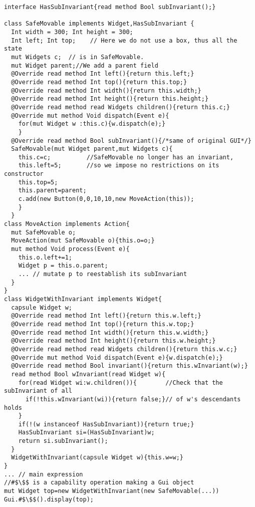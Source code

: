 \begin{lstlisting}
interface HasSubInvariant{read method Bool subInvariant();}

class SafeMovable implements Widget,HasSubInvariant {
  Int width = 300; Int height = 300;
  Int left; Int top;    // Here we do not use a box, thus all the state
  mut Widgets c;  // is in SafeMovable.
  mut Widget parent;//We add a parent field
  @Override read method Int left(){return this.left;}
  @Override read method Int top(){return this.top;}
  @Override read method Int width(){return this.width;}
  @Override read method Int height(){return this.height;}
  @Override read method read Widgets children(){return this.c;}
  @Override mut method Void dispatch(Event e){
    for(mut Widget w :this.c){w.dispatch(e);}
    }
  @Override read method Bool subInvariant(){/*same of original GUI*/}
  SafeMovable(mut Widget parent,mut Widgets c){
    this.c=c;          //SafeMovable no longer has an invariant,
    this.left=5;       //so we impose no restrictions on its constructor
    this.top=5;
    this.parent=parent;
    c.add(new Button(0,0,10,10,new MoveAction(this));
    }
  }
class MoveAction implements Action{
  mut SafeMovable o;
  MoveAction(mut SafeMovable o){this.o=o;}
  mut method Void process(Event e){
    this.o.left+=1;
    Widget p = this.o.parent;
    ... // mutate p to reestablish its subInvariant
  }
}
class WidgetWithInvariant implements Widget{
  capsule Widget w;
  @Override read method Int left(){return this.w.left;}
  @Override read method Int top(){return this.w.top;}
  @Override read method Int width(){return this.w.width;}
  @Override read method Int height(){return this.w.height;}
  @Override read method read Widgets children(){return this.w.c;}
  @Override mut method Void dispatch(Event e){w.dispatch(e);}
  @Override read method Bool invariant(){return this.wInvariant(w);}
  read method Bool wInvariant(read Widget w){
    for(read Widget wi:w.children()){        //Check that the subInvariant of all
      if(!this.wInvariant(wi)){return false;}// of w's descendants holds
    }
    if(!(w instanceof HasSubInvariant)){return true;}
    HasSubInvariant si=(HasSubInvariant)w;
    return si.subInvariant();
  }
  WidgetWithInvariant(capsule Widget w){this.w=w;}
}
... // main expression
//#$\$$ is a capability operation making a Gui object
mut Widget top=new WidgetWithInvariant(new SafeMovable(...))
Gui.#$\$$().display(top);
\end{lstlisting}

